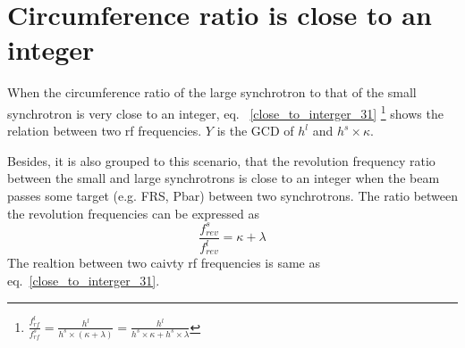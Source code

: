 \section{Circumference ratio is close to an integer}
\label{sec:close_to_int}
When the circumference ratio of the large synchrotron to that of the small synchrotron is very close to an integer, eq. ~\ref{close_to_interger_31} \footnote{$\frac{f_{\mathit{rf}}^{l}}{f_{\mathit{rf}}^{s}}=\frac{h^l}{h^s \times ( \kappa+ \lambda)}=\frac{h^l}{h^s \times  \kappa+ h^s \times \lambda}$} shows the relation between two rf frequencies. $Y$ is the GCD of $h^l$ and $h^s \times \kappa$.



Besides, it is also grouped to this scenario, that the revolution frequency ratio between the small and large synchrotrons is close to an integer when the beam passes some target (e.g. FRS, Pbar) between two synchrotrons. The ratio between the revolution frequencies can be expressed as
\begin{equation} 
\frac{f_{\mathit{rev}}^{s}}{f_{\mathit{rev}}^{l}}=\kappa+ \lambda\label{close_to_interger1}
\end{equation}
The realtion between two caivty rf frequencies is same as eq.~\ref{close_to_interger_31}.

